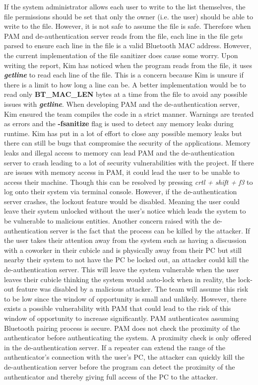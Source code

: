 \documentclass[letterpaper,twocolumn,10pt]{article}
\begin{document}
{{If the system administrator allows each user to write to the list themselves, the file permissions should be set that only the owner (i.e. the user) should be able to write to the file. However, it is not safe to assume the file is safe. Therefore when PAM and de-authentication server reads from the file, each line in the file gets parsed to ensure each line in the file is a valid Bluetooth MAC address. However, the current implementation of the file sanitizer does cause some worry. Upon writing the report, Kim has noticed when the program reads from the file, it uses \textbf{\emph{getline}} to read each line of the file. This is a concern because Kim is unsure if there is a limit to how long a line can be. A better implementation would be to read only \textbf{BT\_MAC\_LEN} bytes at a time from the file to avoid any possible issues with \textbf{\emph{getline}}. When developing PAM and the de-authentication server, Kim ensured the team compiles the code in a strict manner. Warnings are treated as errors and the \textbf{-fsanitize} flag is used to detect any memory leaks during runtime. Kim has put in a lot of effort to close any possible memory leaks but there can still be bugs that compromise the security of the applications. Memory leaks and illegal access to memory can lead PAM and the de-authentication server to crash leading to a lot of security vulnerabilities with the project. If there are issues with memory access in PAM, it could lead the user to be unable to access their machine. Though this can be resolved by pressing \emph{crtl + shift + f3} to log onto their system via terminal console. However, if the de-authentication server crashes, the lockout feature would be disabled. Meaning the user could leave their system unlocked without the user's notice which leads the system to be vulnerable to malicious entities. Another concern raised with the de-authentication server is the fact that the process can be killed by the attacker. If the user takes their attention away from the system such as having a discussion with a coworker in their cubicle and is physically away from their PC but still nearby their system to not have the PC be locked out, an attacker could kill the de-authentication server. This will leave the system vulnerable when the user leaves their cubicle thinking the system would auto-lock when in reality, the lock-out feature was disabled by a malicious attacker. The team will assume this risk to be low since the window of opportunity is small and unlikely. However, there exists a possible vulnerability with PAM that could lead to the risk of this window of opportunity to increase significantly. PAM authenticates assuming Bluetooth pairing process is secure. PAM does not check the proximity of the authenticator before authenticating the system. A proximity check is only offered in the de-authentication server. If a repeater can extend the range of the authenticator's connection with the user's PC, the attacker can quickly kill the de-authentication server before the program can detect the proximity of the authenticator and thereby giving full access of the PC to the attacker.

}}
\end{document}
